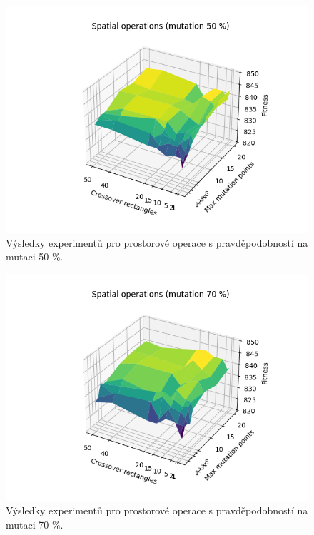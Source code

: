 \documentclass[12pt]{article}
\begin{document}
\begin{figure}
    \centering
    \includegraphics[width=0.6\paperwidth,trim={0 0.2cm 0 0.8cm},clip]{spatial50.png}
    \caption{Výsledky experimentů pro prostorové operace s pravděpodobností na mutaci 50 \%.}
    \label{spatial50}
\end{figure}

\begin{figure}
    \centering
    \includegraphics[width=0.6\paperwidth,trim={0  0.2cm 0 0.8cm},clip]{spatial70.png}
    \caption{Výsledky experimentů pro prostorové operace s pravděpodobností na mutaci 70 \%.}
    \label{spatial70}
\end{figure}
\end{document}
